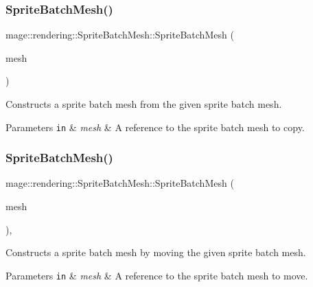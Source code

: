 \subsubsection{\texorpdfstring{Sprite\+Batch\+Mesh()}{SpriteBatchMesh()}\hspace{0.1cm}{\footnotesize\ttfamily [2/3]}}
{\footnotesize\ttfamily mage\+::rendering\+::\+Sprite\+Batch\+Mesh\+::\+Sprite\+Batch\+Mesh (\begin{DoxyParamCaption}\item[{const \hyperlink{classmage_1_1rendering_1_1_sprite_batch_mesh}{Sprite\+Batch\+Mesh} \&}]{mesh }\end{DoxyParamCaption})\hspace{0.3cm}{\ttfamily [delete]}}

Constructs a sprite batch mesh from the given sprite batch mesh.


\begin{DoxyParams}[1]{Parameters}
\mbox{\tt in}  & {\em mesh} & A reference to the sprite batch mesh to copy. \\
\hline
\end{DoxyParams}
\hypertarget{classmage_1_1rendering_1_1_sprite_batch_mesh_af36ff5857269d512b8d6799d1121599d}{}\label{classmage_1_1rendering_1_1_sprite_batch_mesh_af36ff5857269d512b8d6799d1121599d} 
\subsubsection{\texorpdfstring{Sprite\+Batch\+Mesh()}{SpriteBatchMesh()}\hspace{0.1cm}{\footnotesize\ttfamily [3/3]}}
{\footnotesize\ttfamily mage\+::rendering\+::\+Sprite\+Batch\+Mesh\+::\+Sprite\+Batch\+Mesh (\begin{DoxyParamCaption}\item[{\hyperlink{classmage_1_1rendering_1_1_sprite_batch_mesh}{Sprite\+Batch\+Mesh} \&\&}]{mesh }\end{DoxyParamCaption})\hspace{0.3cm}{\ttfamily [default]}, {\ttfamily [noexcept]}}

Constructs a sprite batch mesh by moving the given sprite batch mesh.


\begin{DoxyParams}[1]{Parameters}
\mbox{\tt in}  & {\em mesh} & A reference to the sprite batch mesh to move. \\
\hline
\end{DoxyParams}
\hypertarget{classmage_1_1rendering_1_1_sprite_batch_mesh_a3228406dcd17c971ab84e2565c547d8c}{}\label{classmage_1_1rendering_1_1_sprite_batch_mesh_a3228406dcd17c971ab84e2565c547d8c} 
